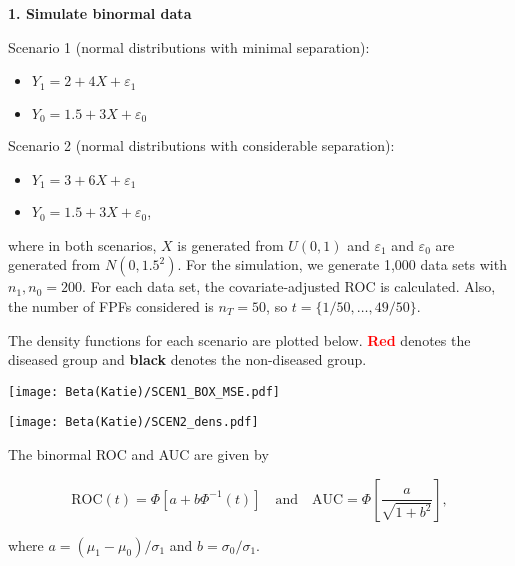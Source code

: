 \documentclass{article}
\newcommand{\si}{\sigma}
\renewcommand{\l}{\left}
\renewcommand{\r}{\right}
\begin{document}
{\large\textbf{1. Simulate binormal data}}

\vspace{.05in}

Scenario 1 (normal distributions with minimal separation):

\vspace{-.1in}

\begin{itemize}
    \item[] $Y_1 = 2 + 4X + \varepsilon_1$
    \item[] $Y_0 = 1.5 + 3X + \varepsilon_0$
\end{itemize}

Scenario 2 (normal distributions with considerable separation):

\vspace{-.1in}

\begin{itemize}
    \item[] $Y_1 = 3 + 6X + \varepsilon_1$
    \item[] $Y_0 = 1.5 + 3X + \varepsilon_0$,
\end{itemize}

where in both scenarios, $X$ is generated from $U(0,1)$ and $\varepsilon_1$ and $\varepsilon_0$ are generated from $N(0, 1.5^2)$. For the simulation, we generate 1,000 data sets with $n_1, n_0 = 200$. For each data set, the covariate-adjusted ROC is calculated. Also, the number of FPFs considered is $n_T = 50$, so $t = \{1/50, \dots, 49/50\}.$

\vspace{.1in}

The density functions for each scenario are plotted below. \textbf{\textcolor{red}{Red}} denotes the diseased group and \textbf{black} denotes the non-diseased group.

{\centering\texttt{[image: Beta(Katie)/SCEN1\_BOX\_MSE.pdf]}}

{\centering\texttt{[image: Beta(Katie)/SCEN2\_dens.pdf]}}

\vspace{.1in}

The binormal ROC and AUC are given by

$$\text{ROC}(t) = \Phi\l[a + b\Phi^{-1}(t)\r] \quad \text{and} \quad \text{AUC} = \Phi\l[\frac{a}{\sqrt{1 + b^2}}\r],$$

where $a = (\mu_1 - \mu_0)/\si_1$ and $b = \si_0/\si_1$.

\vspace{.1in}
\end{document}
